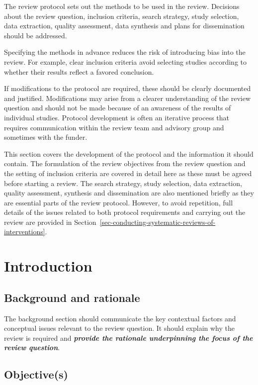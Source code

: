 \documentclass[
  10pt,
  a4paper,
  DIV=11,
  numbers=noendperiod]{scrreprt}
\begin{document}
The review protocol sets out the methods to be used in the review.
Decisions about the review question, inclusion criteria, search
strategy, study selection, data extraction, quality assessment, data
synthesis and plans for dissemination should be addressed.

Specifying the methods in advance reduces the risk of introducing bias
into the review. For example, clear inclusion criteria avoid selecting
studies according to whether their results reflect a favored conclusion.

If modifications to the protocol are required, these should be clearly
documented and justified. Modifications may arise from a clearer
understanding of the review question and should not be made because of
an awareness of the results of individual studies. Protocol development
is often an iterative process that requires communication within the
review team and advisory group and sometimes with the funder.

This section covers the development of the protocol and the information
it should contain. The formulation of the review objectives from the
review question and the setting of inclusion criteria are covered in
detail here as these must be agreed before starting a review. The search
strategy, study selection, data extraction, quality assessment,
synthesis and dissemination are also mentioned briefly as they are
essential parts of the review protocol. However, to avoid repetition,
full details of the issues related to both protocol requirements and
carrying out the review are provided in
Section~\ref{sec-conducting-systematic-reviews-of-interventions}.

\section{Introduction}\label{introduction-1}

\subsection{Background and rationale}\label{background-and-rationale}

The background section should communicate the key contextual factors and
conceptual issues relevant to the review question. It should explain why
the review is required and \textbf{\emph{provide the rationale
underpinning the focus of the review question}}.

\subsection{Objective(s)}\label{objectives}
\end{document}
